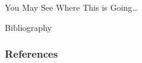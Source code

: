 \documentclass[11pt,dvipsnames,usenames,aspectratio=169]{beamer}  %
\begin{document}
\begin{frame}{You May See Where This is Going\ldots}
  \begin{center}
  \end{center}
\end{frame}

\begin{frame}[allowframebreaks]{Bibliography}
  {\tiny
    \frametitle{References}
    
    
  }
\end{frame}
\end{document}
